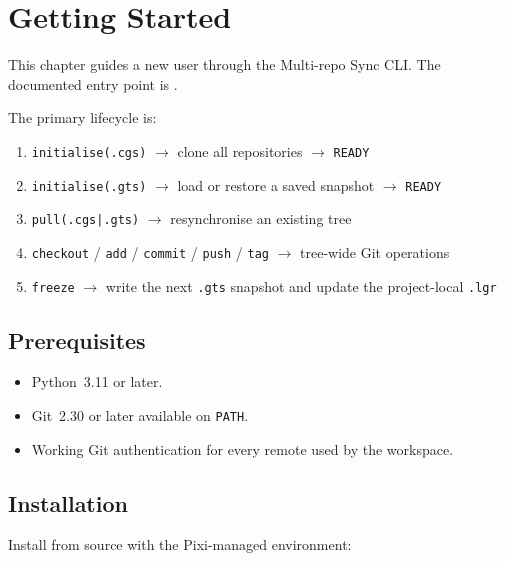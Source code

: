 
\chapter{Getting Started}

This chapter guides a new user through the Multi-repo Sync CLI. The documented
entry point is \cgscli{}.

The primary lifecycle is:

\begin{enumerate}
  \item \texttt{initialise(.cgs)} $\rightarrow$ clone all repositories
        $\rightarrow$ \texttt{READY}
  \item \texttt{initialise(.gts)} $\rightarrow$ load or restore a saved
        snapshot $\rightarrow$ \texttt{READY}
  \item \texttt{pull(.cgs|.gts)} $\rightarrow$ resynchronise an existing tree
  \item \texttt{checkout} / \texttt{add} / \texttt{commit} / \texttt{push} /
        \texttt{tag} $\rightarrow$ tree-wide Git operations
  \item \texttt{freeze} $\rightarrow$ write the next \texttt{.gts} snapshot
        and update the project-local \texttt{.lgr}
\end{enumerate}

\section{Prerequisites}

\begin{itemize}
  \item Python~3.11 or later.
  \item Git~2.30 or later available on \texttt{PATH}.
  \item Working Git authentication for every remote used by the workspace.
\end{itemize}

\section{Installation}

Install \cgspkg{} from source with the Pixi-managed environment:

